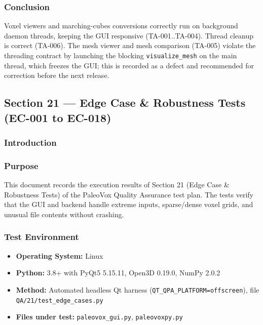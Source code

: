 \documentclass[12pt,a4paper]{article}
\begin{document}
\subsubsection{Conclusion}

Voxel viewers and marching-cubes conversions correctly run on background
daemon threads, keeping the GUI responsive (TA-001..TA-004). Thread cleanup is
correct (TA-006). The mesh viewer and mesh comparison (TA-005) violate the
threading contract by launching the blocking \texttt{visualize\_mesh} on the
main thread, which freezes the GUI; this is recorded as a defect and
recommended for correction before the next release.

\newpage

\subsection{Section 21 --- Edge Case \& Robustness Tests (EC-001 to EC-018)}

\subsubsection{Introduction}

\subsubsection{Purpose}
This document records the execution results of Section 21 (Edge Case \&
Robustness Tests) of the PaleoVox Quality Assurance test plan. The tests
verify that the GUI and backend handle extreme inputs, sparse/dense voxel
grids, and unusual file contents without crashing.

\subsubsection{Test Environment}
\begin{itemize}
  \item \textbf{Operating System:} Linux
  \item \textbf{Python:} 3.8+ with PyQt5 5.15.11, Open3D 0.19.0, NumPy 2.0.2
  \item \textbf{Method:} Automated headless Qt harness
    (\texttt{QT\_QPA\_PLATFORM=offscreen}), file
    \texttt{QA/21/test\_edge\_cases.py}
  \item \textbf{Files under test:} \texttt{paleovox\_gui.py},
    \texttt{paleovoxpy.py}
\end{itemize}
\end{document}

